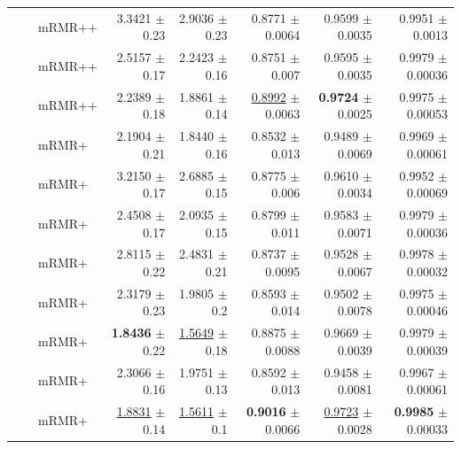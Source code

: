\begin{longtable}{llp{}rrrrr}
 &  & mRMR++ & 3.3421 {\scriptsize $\pm$ 0.23} & 2.9036 {\scriptsize $\pm$ 0.23} & 0.8771 {\scriptsize $\pm$ 0.0064} & 0.9599 {\scriptsize $\pm$ 0.0035} & 0.9951 {\scriptsize $\pm$ 0.0013} \\
 &  & mRMR++ & 2.5157 {\scriptsize $\pm$ 0.17} & 2.2423 {\scriptsize $\pm$ 0.16} & 0.8751 {\scriptsize $\pm$ 0.007} & 0.9595 {\scriptsize $\pm$ 0.0035} & 0.9979 {\scriptsize $\pm$ 0.00036} \\
 &  & mRMR++ & 2.2389 {\scriptsize $\pm$ 0.18} & 1.8861 {\scriptsize $\pm$ 0.14} & \underline{0.8992} {\scriptsize $\pm$ 0.0063} & \textbf{0.9724} {\scriptsize $\pm$ 0.0025} & 0.9975 {\scriptsize $\pm$ 0.00053} \\
 &  & mRMR+ & 2.1904 {\scriptsize $\pm$ 0.21} & 1.8440 {\scriptsize $\pm$ 0.16} & 0.8532 {\scriptsize $\pm$ 0.013} & 0.9489 {\scriptsize $\pm$ 0.0069} & 0.9969 {\scriptsize $\pm$ 0.00061} \\
 &  & mRMR+ & 3.2150 {\scriptsize $\pm$ 0.17} & 2.6885 {\scriptsize $\pm$ 0.15} & 0.8775 {\scriptsize $\pm$ 0.006} & 0.9610 {\scriptsize $\pm$ 0.0034} & 0.9952 {\scriptsize $\pm$ 0.00069} \\
 &  & mRMR+ & 2.4508 {\scriptsize $\pm$ 0.17} & 2.0935 {\scriptsize $\pm$ 0.15} & 0.8799 {\scriptsize $\pm$ 0.011} & 0.9583 {\scriptsize $\pm$ 0.0071} & 0.9979 {\scriptsize $\pm$ 0.00036} \\
 &  & mRMR+ & 2.8115 {\scriptsize $\pm$ 0.22} & 2.4831 {\scriptsize $\pm$ 0.21} & 0.8737 {\scriptsize $\pm$ 0.0095} & 0.9528 {\scriptsize $\pm$ 0.0067} & 0.9978 {\scriptsize $\pm$ 0.00032} \\
 &  & mRMR+ & 2.3179 {\scriptsize $\pm$ 0.23} & 1.9805 {\scriptsize $\pm$ 0.2} & 0.8593 {\scriptsize $\pm$ 0.014} & 0.9502 {\scriptsize $\pm$ 0.0078} & 0.9975 {\scriptsize $\pm$ 0.00046} \\
 &  & mRMR+ & \textbf{1.8436} {\scriptsize $\pm$ 0.22} & \underline{1.5649} {\scriptsize $\pm$ 0.18} & 0.8875 {\scriptsize $\pm$ 0.0088} & 0.9669 {\scriptsize $\pm$ 0.0039} & 0.9979 {\scriptsize $\pm$ 0.00039} \\
 &  & mRMR+ & 2.3066 {\scriptsize $\pm$ 0.16} & 1.9751 {\scriptsize $\pm$ 0.13} & 0.8592 {\scriptsize $\pm$ 0.013} & 0.9458 {\scriptsize $\pm$ 0.0081} & 0.9967 {\scriptsize $\pm$ 0.00061} \\
 &  & mRMR+ & \underline{1.8831} {\scriptsize $\pm$ 0.14} & \underline{1.5611} {\scriptsize $\pm$ 0.1} & \textbf{0.9016} {\scriptsize $\pm$ 0.0066} & \underline{0.9723} {\scriptsize $\pm$ 0.0028} & \textbf{0.9985} {\scriptsize $\pm$ 0.00033} \\

\end{longtable}
